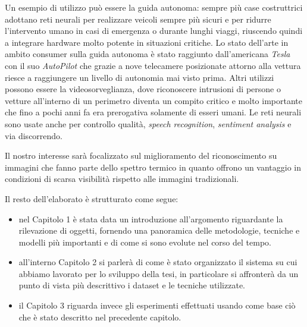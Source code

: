 Un esempio di utilizzo può essere la guida autonoma: sempre più case costruttrici adottano reti neurali
per realizzare veicoli sempre più sicuri e per ridurre l'intervento umano in casi di emergenza o durante lunghi viaggi, riuscendo quindi a integrare hardware molto potente in situazioni critiche. 
Lo stato dell'arte in ambito consumer sulla guida autonoma è stato raggiunto dall'americana \textit{Tesla} con il suo \textit{AutoPilot} che 
grazie a nove telecamere posizionate attorno alla vettura riesce a raggiungere un livello di autonomia mai visto prima.
Altri utilizzi possono essere la videosorveglianza, dove riconoscere intrusioni di persone o vetture all'interno di un perimetro diventa un compito critico e molto importante che fino a pochi anni fa era prerogativa solamente di esseri umani. 
Le reti neurali sono usate anche per controllo qualità, \textit{speech recognition}, \textit{sentiment analysis} e via discorrendo. 


Il nostro interesse sarà focalizzato sul miglioramento del riconoscimento su immagini che fanno parte dello spettro termico in quanto offrono un vantaggio in condizioni di scarsa visibilità rispetto alle immagini tradizionali.

Il resto dell'elaborato è strutturato come segue:
\begin{itemize}
    \item nel Capitolo 1 è stata data un introduzione all'argomento riguardante la rilevazione di oggetti, fornendo una panoramica delle metodologie, tecniche e modelli più importanti e di come si sono evolute nel corso del tempo. 
    \item all'interno Capitolo 2 si parlerà di come è stato organizzato il sistema su cui abbiamo lavorato per lo sviluppo della tesi, in particolare si affronterà da un punto di vista più descrittivo i dataset e le tecniche utilizzate. 
    \item il Capitolo 3 riguarda invece gli esperimenti effettuati usando come base ciò che è stato descritto nel precedente capitolo. 
\end{itemize}